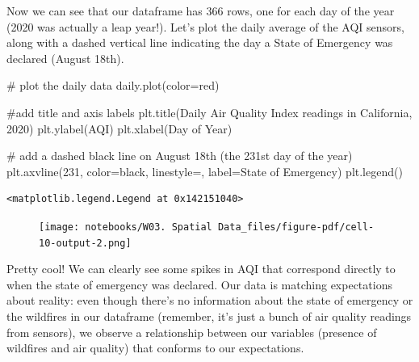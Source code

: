 \documentclass[
  letterpaper,
  DIV=11,
  numbers=noendperiod]{scrreprt}
\newenvironment{Shaded}{\begin{snugshade}}{\end{snugshade}}
\newcommand{\CommentTok}[1]{\textcolor[rgb]{0.37,0.37,0.37}{#1}}
\newcommand{\DecValTok}[1]{\textcolor[rgb]{0.68,0.00,0.00}{#1}}
\newcommand{\NormalTok}[1]{\textcolor[rgb]{0.00,0.23,0.31}{#1}}
\newcommand{\OperatorTok}[1]{\textcolor[rgb]{0.37,0.37,0.37}{#1}}
\newcommand{\StringTok}[1]{\textcolor[rgb]{0.13,0.47,0.30}{#1}}
\begin{document}
Now we can see that our dataframe has 366 rows, one for each day of the
year (2020 was actually a leap year!). Let's plot the daily average of
the AQI sensors, along with a dashed vertical line indicating the day a
State of Emergency was declared (August 18th).

\begin{Shaded}
\begin{Highlighting}[]
\CommentTok{\# plot the daily data}
\NormalTok{daily.plot(color}\OperatorTok{=}\StringTok{\textquotesingle{}red\textquotesingle{}}\NormalTok{)}

\CommentTok{\#add title and axis labels}
\NormalTok{plt.title(}\StringTok{\textquotesingle{}Daily Air Quality Index readings in California, 2020\textquotesingle{}}\NormalTok{)}
\NormalTok{plt.ylabel(}\StringTok{\textquotesingle{}AQI\textquotesingle{}}\NormalTok{)}
\NormalTok{plt.xlabel(}\StringTok{\textquotesingle{}Day of Year\textquotesingle{}}\NormalTok{)}

\CommentTok{\# add a dashed black line on August 18th (the 231st day of the year)}
\NormalTok{plt.axvline(}\DecValTok{231}\NormalTok{, color}\OperatorTok{=}\StringTok{\textquotesingle{}black\textquotesingle{}}\NormalTok{, linestyle}\OperatorTok{=}\StringTok{\textquotesingle{}{-}{-}\textquotesingle{}}\NormalTok{, label}\OperatorTok{=}\StringTok{\textquotesingle{}State of Emergency\textquotesingle{}}\NormalTok{)}
\NormalTok{plt.legend()}
\end{Highlighting}
\end{Shaded}

\begin{verbatim}
<matplotlib.legend.Legend at 0x142151040>
\end{verbatim}

\begin{figure}[H]

{\centering \texttt{[image: notebooks/W03. Spatial Data\_files/figure-pdf/cell-10-output-2.png]}

}

\end{figure}

Pretty cool! We can clearly see some spikes in AQI that correspond
directly to when the state of emergency was declared. Our data is
matching expectations about reality: even though there's no information
about the state of emergency or the wildfires in our dataframe
(remember, it's just a bunch of air quality readings from sensors), we
observe a relationship between our variables (presence of wildfires and
air quality) that conforms to our expectations.
\end{document}
